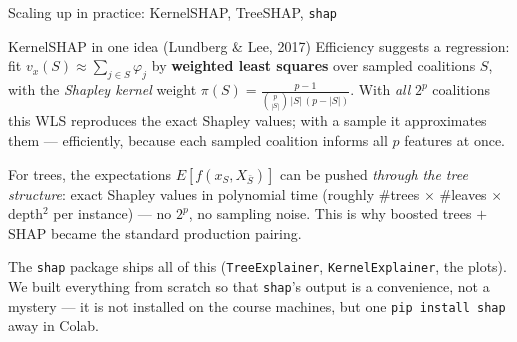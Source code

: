 \documentclass[aspectratio=169,11pt]{beamer}
\begin{document}
\begin{frame}{Scaling up in practice: KernelSHAP, TreeSHAP, \texttt{shap}}
  \footnotesize
  \begin{block}{KernelSHAP in one idea (Lundberg \& Lee, 2017)}
    Efficiency suggests a regression: fit $v_x(S) \approx \sum_{j\in S}\varphi_j$
    by \textbf{weighted least squares} over sampled coalitions $S$, with the
    \emph{Shapley kernel} weight
    $\pi(S) = \frac{p-1}{\binom{p}{|S|}\,|S|\,(p-|S|)}$.
    With \emph{all} $2^p$ coalitions this WLS reproduces the exact Shapley values;
    with a sample it approximates them --- efficiently, because each sampled
    coalition informs all $p$ features at once.
  \end{block}
  \begin{readme}
    For trees, the expectations $E[f(x_S, X_{\bar S})]$ can be pushed \emph{through
    the tree structure}: exact Shapley values in polynomial time (roughly \#trees
    $\times$ \#leaves $\times$ depth$^2$ per instance) --- no $2^p$, no sampling
    noise. This is why boosted trees $+$ SHAP became the standard production pairing.
  \end{readme}
  \begin{takeaway}
    The \texttt{shap} package ships all of this (\texttt{TreeExplainer},
    \texttt{KernelExplainer}, the plots). We built everything from scratch so that
    \texttt{shap}'s output is a convenience, not a mystery --- it is not installed on
    the course machines, but one \texttt{pip install shap} away in Colab.
  \end{takeaway}
\end{frame}
\end{document}

